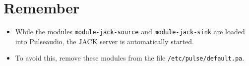 






\chapter{Remember}
\begin{itemize}

\item While the modules \texttt{module-jack-source} and
  \texttt{module-jack-sink} are loaded into Pulseaudio, the JACK
  server is automatically started.

\item To avoid this, remove these modules from the file
  \texttt{/etc/pulse/default.pa}.

\end{itemize}
